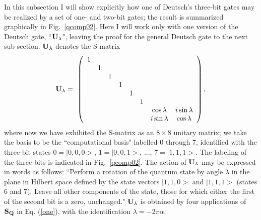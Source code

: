 In this subsection I will show explicitly how one of Deutsch's three-bit
gates may be realized by a set of one- and two-bit gates; the result is
summarized graphically in Fig.~\ref{qcomp02}.  Here I will work only with
one version of the Deutsch gate, ``${\bf U}_\lambda$", leaving the proof for
the general Deutsch gate to the next sub-section.  ${\bf U}_\lambda$
denotes the S-matrix
\renewcommand{\arraystretch}{0.65}
\begin{equation}
{\bf U}_\lambda=\ \left(\begin{array}{cccccccc}1&\ &\ &\ &\ &\ &\ &\ \\
\ &1 &\ &\ &\ &\ &\ &\ \\ \ &\ &1 &\ &\ &\ &\ &\ \\ \ &\ &\ &1 &\ &\ &\ &\ \\
\ &\ &\ &\ &1 &\ &\ &\ \\ \ &\ &\ &\ &\ &1 &\ &\ \\
\ &\ &\ &\ &\ &\ &\cos\lambda &i\sin\lambda \\
\ &\ &\ &\ &\ &\ &i\sin\lambda &\cos\lambda \end{array}\right)\label{four},
\end{equation}
where now we have exhibited the S-matrix as an $8\times 8$ unitary matrix;
we take the basis to be the ``computational basis" labelled 0 through 7,
identified with the three-bit states $0=|0,0,0>$, $1=|0,0,1>$, ...,
$7=|1,1,1>$.  The labeling of the three bits is indicated in
Fig.~\ref{qcomp02}.
The action of ${\bf U}_\lambda$ may be expressed in words
as follows: ``Perform a rotation
of the quantum state by angle $\lambda$ in the plane in Hilbert space defined
by the state vectors $|1,1,0>$ and $|1,1,1>$ (states 6 and 7).  Leave
all other components of the state, those for which either the first of the
second bit is a zero, unchanged."  ${\bf U}_\lambda$ is obtained by four
applications of ${\bf S_Q}$ in Eq. (\ref{one}), with the identification
$\lambda=-2\pi\alpha$.

